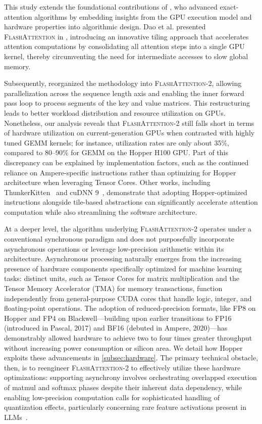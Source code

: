 This study extends the foundational contributions of \citet{dao2022flashattention}, who advanced exact-attention algorithms by embedding insights from the GPU execution model and hardware properties into algorithmic design. Dao et al. presented \textsc{FlashAttention} in \citep{dao2022flashattention}, introducing an innovative tiling approach that accelerates attention computations by consolidating all attention steps into a single GPU kernel, thereby circumventing the need for intermediate accesses to slow global memory.

Subsequently, \citet{dao2023flashattention2} reorganized the methodology into \textsc{FlashAttention-2}, allowing parallelization across the sequence length axis and enabling the inner forward pass loop to process segments of the key and value matrices. This restructuring leads to better workload distribution and resource utilization on GPUs. Nonetheless, our analysis reveals that \textsc{FlashAttention-2} still falls short in terms of hardware utilization on current-generation GPUs when contrasted with highly tuned GEMM kernels; for instance, utilization rates are only about 35\%, compared to 80–90\% for GEMM on the Hopper H100 GPU. Part of this discrepancy can be explained by implementation factors, such as the continued reliance on Ampere-specific instructions rather than optimizing for Hopper architecture when leveraging Tensor Cores. Other works, including ThunkerKitten~\citep{spector2024thunder} and cuDNN 9~\citep{cudnn9}, demonstrate that adopting Hopper-optimized instructions alongside tile-based abstractions can significantly accelerate attention computation while also streamlining the software architecture.

At a deeper level, the algorithm underlying \textsc{FlashAttention-2} operates under a conventional synchronous paradigm and does not purposefully incorporate asynchronous operations or leverage low-precision arithmetic within its architecture. Asynchronous processing naturally emerges from the increasing presence of hardware components specifically optimized for machine learning tasks: distinct units, such as Tensor Cores for matrix multiplication and the Tensor Memory Accelerator (TMA) for memory transactions, function independently from general-purpose CUDA cores that handle logic, integer, and floating-point operations. The adoption of reduced-precision formats, like FP8 on Hopper and FP4 on Blackwell—building upon earlier transitions to FP16 (introduced in Pascal, 2017) and BF16 (debuted in Ampere, 2020)—has demonstrably allowed hardware to achieve two to four times greater throughput without increasing power consumption or silicon area. We detail how Hopper exploits these advancements in \cref{subsec:hardware}.
The primary technical obstacle, then, is to reengineer \textsc{FlashAttention-2} to effectively utilize these hardware optimizations: supporting asynchrony involves orchestrating overlapped execution of matmul and softmax phases despite their inherent data dependency, while enabling low-precision computation calls for sophisticated handling of quantization effects, particularly concerning rare feature activations present in LLMs~\citep{dettmers2208llm, sun2024massive}.

